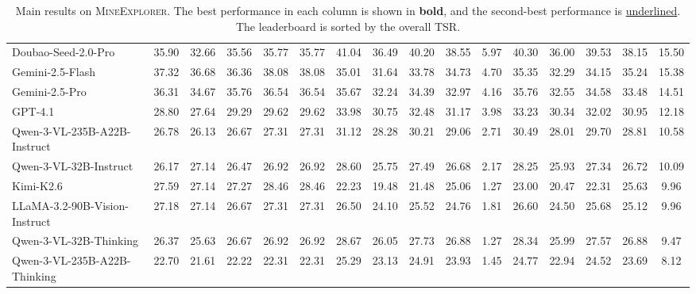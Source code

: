 \documentclass[11pt]{article}
\begin{document}
\begin{table}[t!]
{\begin{tabular}{l|ccccc|ccccc|cccc>{\columncolor{gray!12}}c}
Doubao-Seed-2.0-Pro & 35.90 & 32.66 & 35.56 & 35.77 & 35.77 & 41.04 & 36.49 & 40.20 & 38.55 & 5.97 & 40.30 & 36.00 & 39.53 & 38.15 & 15.50 \\
Gemini-2.5-Flash & 37.32 & 36.68 & 36.36 & 38.08 & 38.08 & 35.01 & 31.64 & 33.78 & 34.73 & 4.70 & 35.35 & 32.29 & 34.15 & 35.24 & 15.38 \\
Gemini-2.5-Pro & 36.31 & 34.67 & 35.76 & 36.54 & 36.54 & 35.67 & 32.24 & 34.39 & 32.97 & 4.16 & 35.76 & 32.55 & 34.58 & 33.48 & 14.51 \\
GPT-4.1 & 28.80 & 27.64 & 29.29 & 29.62 & 29.62 & 33.98 & 30.75 & 32.48 & 31.17 & 3.98 & 33.23 & 30.34 & 32.02 & 30.95 & 12.18 \\
Qwen-3-VL-235B-A22B-Instruct & 26.78 & 26.13 & 26.67 & 27.31 & 27.31 & 31.12 & 28.28 & 30.21 & 29.06 & 2.71 & 30.49 & 28.01 & 29.70 & 28.81 & 10.58 \\
Qwen-3-VL-32B-Instruct & 26.17 & 27.14 & 26.47 & 26.92 & 26.92 & 28.60 & 25.75 & 27.49 & 26.68 & 2.17 & 28.25 & 25.93 & 27.34 & 26.72 & 10.09 \\
Kimi-K2.6 & 27.59 & 27.14 & 27.27 & 28.46 & 28.46 & 22.23 & 19.48 & 21.48 & 25.06 & 1.27 & 23.00 & 20.47 & 22.31 & 25.63 & 9.96 \\
LLaMA-3.2-90B-Vision-Instruct & 27.18 & 27.14 & 26.67 & 27.31 & 27.31 & 26.50 & 24.10 & 25.52 & 24.76 & 1.81 & 26.60 & 24.50 & 25.68 & 25.12 & 9.96 \\
Qwen-3-VL-32B-Thinking & 26.37 & 25.63 & 26.67 & 26.92 & 26.92 & 28.67 & 26.05 & 27.73 & 26.88 & 1.27 & 28.34 & 25.99 & 27.57 & 26.88 & 9.47 \\
Qwen-3-VL-235B-A22B-Thinking & 22.70 & 21.61 & 22.22 & 22.31 & 22.31 & 25.29 & 23.13 & 24.91 & 23.93 & 1.45 & 24.77 & 22.94 & 24.52 & 23.69 & 8.12 \\
\bottomrule
\end{tabular}}
\caption{
Main results on \textsc{MineExplorer}. The best performance in each column is shown in \textbf{bold}, and the second-best performance is \underline{underlined}. 
The leaderboard is sorted by the overall TSR.
}
\label{tab:main_results}
\end{table}
\end{document}
